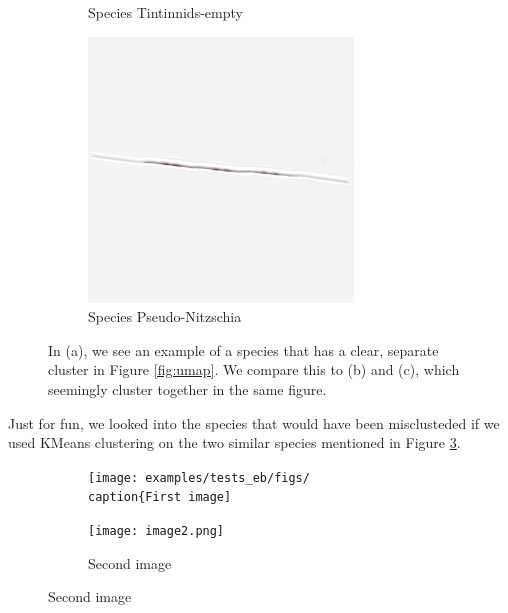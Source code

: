 \begin{figure}[H]
\begin{subfigure}[b]{0.32\linewidth}
        \caption{Species Tintinnids-empty}
        \label{fig:empty}
    \end{subfigure}
    \begin{subfigure}[b]{0.32\linewidth}
        \centering
        \includegraphics[width=\linewidth]{examples/tests_eb/figs/plankton_examplebatch/pseudo.png}
        \caption{Species Pseudo-Nitzschia}
        \label{fig:pseudo}
    \end{subfigure}
    \caption{In (a), we see an example of a species that has a clear, separate cluster in Figure \ref{fig:umap}. We compare this to (b) and (c), which seemingly cluster together in the same figure.}
    \label{fig:grid}
\end{figure}

Just for fun, we looked into the species that would have been misclusteded if we used KMeans clustering on the two similar species mentioned in Figure \ref{fig:grid}. 

\begin{figure}[H]
    \centering
    \begin{subfigure}[b]{0.8\linewidth}
        \texttt{[image: examples/tests\_eb/figs/
        \\caption\{First image]}
    \end{subfigure}
    
    \vspace{1em}
    
    \begin{subfigure}[b]{0.8\linewidth}
        \texttt{[image: image2.png]}
        \caption{Second image}
    \end{subfigure}
\end{figure}


